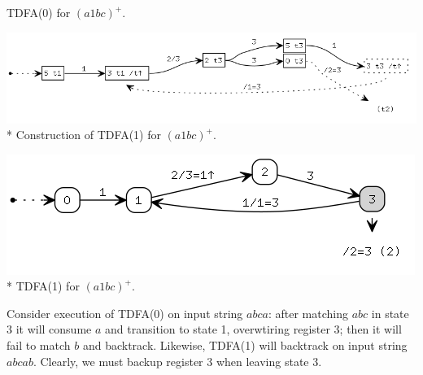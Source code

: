 \documentclass{article}
\theoremstyle{definition}
\begin{document}
\begin{multicols}{2}
\begin{center}
\footnotesize{TDFA(0) for $(a 1 bc)^+$.} \\
\end{center}
\begin{center}
\includegraphics[width=\linewidth]{img/fallback/tdfa1_raw.png}\\*
\footnotesize{Construction of TDFA(1) for $(a 1 bc)^+$.} \\
\end{center}
\begin{center}
\includegraphics[width=0.8\linewidth]{img/fallback/tdfa1.png}\\*
\footnotesize{TDFA(1) for $(a 1 bc)^+$.} \\
\end{center}
Consider execution of TDFA(0) on input string $abca$: after matching $abc$ in state 3 it will consume $a$ and transition to state 1,
overwtiring register 3; then it will fail to match $b$ and backtrack.
Likewise, TDFA(1) will backtrack on input string $abcab$.
Clearly, we must backup register 3 when leaving state 3.
\\


\end{multicols}
\end{document}
